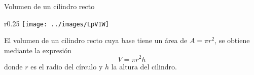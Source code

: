 
\begin{infocard}{Volumen de un cilindro recto}
    \begin{wrapfigure}{r}{0.25\linewidth}
        \centering
        \texttt{[image: ../images/LpV1W]}
    \end{wrapfigure}
    El volumen de un cilindro recto cuya base tiene un área de $A=\pi r^2$, se obtiene mediante la expresión
    \[  V = \pi r^2h  \]
    donde $r$ es el radio del círculo y $h$ la altura del cilindro.
\end{infocard}



